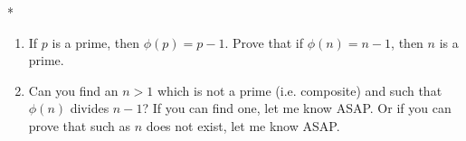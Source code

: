 *
  \begin{enumerate}[nosep,label=\textnormal{(\alph*)}]
  \item If $p$ is a prime, then $\phi(p) = p - 1$.
    Prove that if $\phi(n) = n - 1$, then $n$ is a prime.
  \item
    Can you find an $n > 1$ which is not a prime (i.e. composite)
    and such that
    $\phi(n)$ divides $n - 1$?
    If you can find one, let me know ASAP.
    Or if you can prove that such as $n$ does not exist, let me know ASAP.
  \end{enumerate}

\BEGINCOMMENT
\ENDCOMMENT

